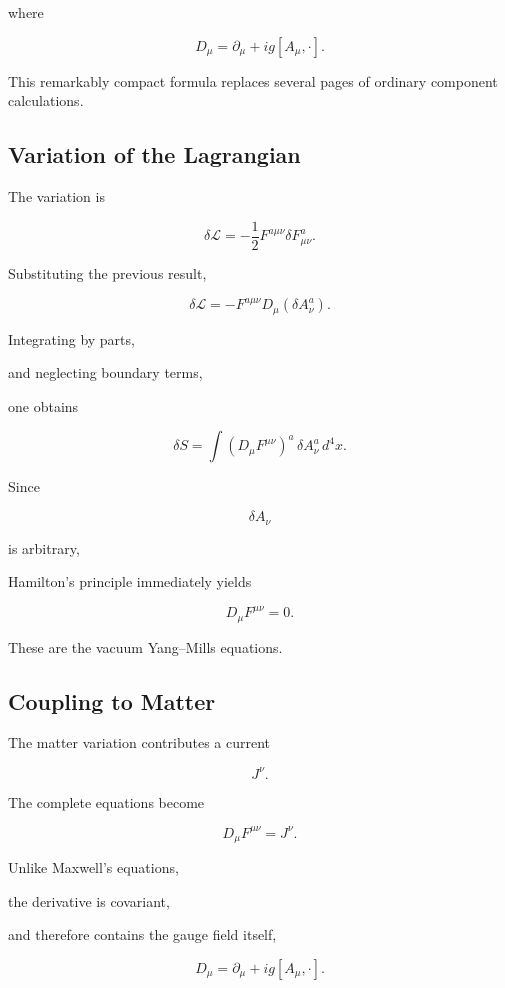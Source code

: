 where

\[
D_\mu
=
\partial_\mu
+
ig[A_\mu,\cdot].
\]

This remarkably compact formula replaces several pages of ordinary
component calculations.


\subsection{Variation of the Lagrangian}

The variation is

\[
\delta\mathcal L
=
-\frac12
F^{a\mu\nu}
\delta F_{\mu\nu}^a.
\]

Substituting the previous result,

\[
\delta\mathcal L
=
-
F^{a\mu\nu}
D_\mu
(\delta A_\nu^a).
\]

Integrating by parts,

and neglecting boundary terms,

one obtains

\[
\delta S
=
\int
(D_\mu F^{\mu\nu})^a
\,
\delta A_\nu^a
\,d^4x.
\]

Since

\[
\delta A_\nu
\]

is arbitrary,

Hamilton's principle immediately yields

\[
\boxed{
D_\mu
F^{\mu\nu}
=
0.
}
\]

These are the vacuum Yang--Mills equations.


\subsection{Coupling to Matter}

The matter variation contributes a current

\[
J^\nu.
\]

The complete equations become

\[
\boxed{
D_\mu
F^{\mu\nu}
=
J^\nu.
}
\]

Unlike Maxwell's equations,

the derivative is covariant,

and therefore contains the gauge field itself,

\[
D_\mu
=
\partial_\mu
+
ig[A_\mu,\cdot].
\]

